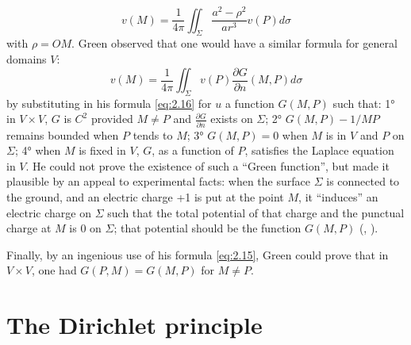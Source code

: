 \documentclass[12pt,a4paper,leqno,twoside]{extbook}
\newcommand{\pder}[2]{\frac{\partial #1}{\partial #2}}
\begin{document}
\begin{equation}
    \label{eq:2.18}
    v(M) = \frac{1}{4\pi} \iint_\Sigma \frac{a^2 - \rho^2}{ar^3} v(P) d\sigma
\end{equation}
with \(\rho = OM\). Green observed that one would have a similar formula for general domains \(V\):
\begin{equation}
    \label{eq:2.19}
    v(M) = \frac{1}{4\pi} \iint_\Sigma v(P) \pder{G}{n}(M, P) d\sigma
\end{equation}
by substituting in his formula \eqref{eq:2.16} for \(u\) a function \(G(M,P)\) such that: 1° in \(V \times V\), \(G\) is \(C^2\) provided \(M \neq P\) and \(\pder{G}{n}\) exists on \(\Sigma\); 2° \(G(M,P) - 1/MP\) remains bounded when \(P\) tends to \(M\); 3° \(G(M,P) = 0\) when \(M\) is in \(V\) and \(P\) on \(\Sigma\); 4° when \(M\) is fixed in \(V\), \(G\), as a function of \(P\), satisfies the Laplace equation in \(V\). He could not prove the existence of such a ``Green function'', but made it plausible by an appeal to experimental facts: when the surface \(\Sigma\) is connected to the ground, and an electric charge +1 is put at the point \(M\), it ``induces'' an electric charge on \(\Sigma\) such that the total potential of that charge and the punctual charge at \(M\) is 0 on \(\Sigma\); that potential should be the function \(G(M,P)\) (\cite{090}, \cite[p.~347--358]{S}).

Finally, by an ingenious use of his formula \eqref{eq:2.15}, Green could prove that in \(V \times V\), one had \(G(P,M) = G(M,P)\) for \(M \neq P\).

\section{The Dirichlet principle}
\label{sec:2.4}
\end{document}
